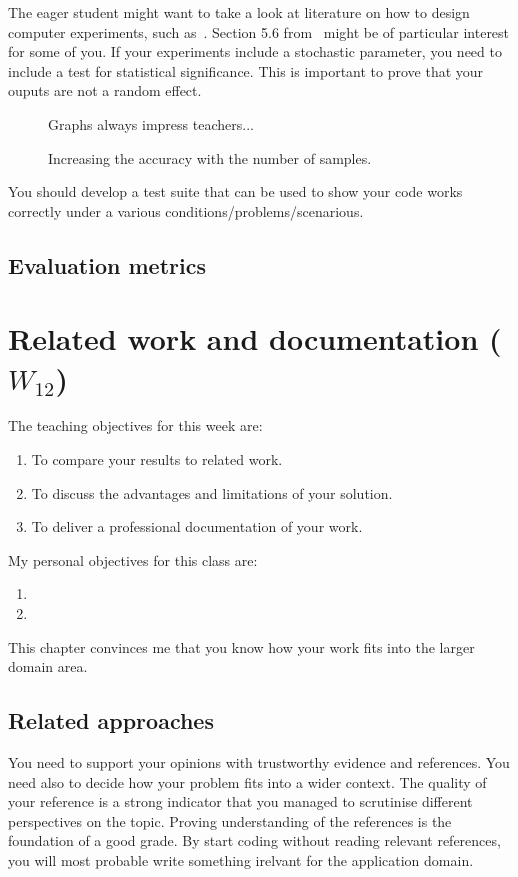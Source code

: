 \documentclass[a4paper,12pt]{report}
\begin{document}
The eager student might want to take a look at literature on how to design computer experiments, such as~\cite{fang2005design}. Section 5.6 from~\cite{fang2005design} might be of particular interest for some of you. 
If your experiments include a stochastic parameter, you need to include a test for statistical significance. 
This is important to prove that your ouputs are not a random effect.



\begin{figure}
Graphs always impress teachers...
\caption{Increasing the accuracy with the number of samples.}
\label{fig:accuracy}
\end{figure}

You should develop a test suite that can be used to show your code works correctly under a various conditions/problems/scenarious.


\section{Evaluation metrics}



\chapter{Related work and documentation ($W_{12}$)}

The teaching objectives for this week are:
\begin{enumerate}
 \item To compare your results to related work.
\item To discuss the advantages and limitations of your solution.
\item To deliver a professional documentation of your work.
\end{enumerate}

\vspace{0.5cm}

My personal objectives for this class are:
\begin{enumerate}
 \item 
 \item 
\end{enumerate}


This chapter convinces me that you know how your work fits into the larger domain area.



\section{Related approaches}
You need to support your opinions with trustworthy evidence and references.
You need also to decide how your problem fits into a wider context.
The quality of your reference is a strong indicator that you 
managed to scrutinise different perspectives on the topic.
Proving understanding of the references is the foundation of a good grade. 
By start coding without reading relevant references, you will most probable write something irelvant for the application domain.  
\end{document}
